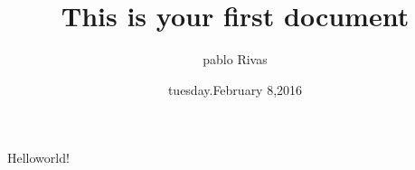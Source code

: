 \documentclass{article}
\title{This is your first document}
\author{pablo Rivas}
\date{tuesday.February 8,2016}
\begin{document}
\maketitle
Helloworld! \\
\end{document}
